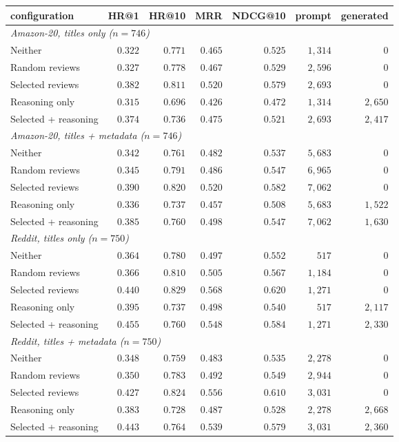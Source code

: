 \begin{tabular}{lrrrrrr}
\toprule
configuration & HR@1 & HR@10 & MRR & NDCG@10 & prompt & generated \\
\midrule\multicolumn{7}{l}{\emph{Amazon-20, titles only ($n=746$)}} \\
Neither & $0.322$ & $0.771$ & $0.465$ & $0.525$ & $1{,}314$ & $0$ \\
Random reviews & $0.327$ & $0.778$ & $0.467$ & $0.529$ & $2{,}596$ & $0$ \\
Selected reviews & $0.382$ & $0.811$ & $0.520$ & $0.579$ & $2{,}693$ & $0$ \\
Reasoning only & $0.315$ & $0.696$ & $0.426$ & $0.472$ & $1{,}314$ & $2{,}650$ \\
Selected + reasoning & $0.374$ & $0.736$ & $0.475$ & $0.521$ & $2{,}693$ & $2{,}417$ \\
\midrule\multicolumn{7}{l}{\emph{Amazon-20, titles + metadata ($n=746$)}} \\
Neither & $0.342$ & $0.761$ & $0.482$ & $0.537$ & $5{,}683$ & $0$ \\
Random reviews & $0.345$ & $0.791$ & $0.486$ & $0.547$ & $6{,}965$ & $0$ \\
Selected reviews & $0.390$ & $0.820$ & $0.520$ & $0.582$ & $7{,}062$ & $0$ \\
Reasoning only & $0.336$ & $0.737$ & $0.457$ & $0.508$ & $5{,}683$ & $1{,}522$ \\
Selected + reasoning & $0.385$ & $0.760$ & $0.498$ & $0.547$ & $7{,}062$ & $1{,}630$ \\
\midrule\multicolumn{7}{l}{\emph{Reddit, titles only ($n=750$)}} \\
Neither & $0.364$ & $0.780$ & $0.497$ & $0.552$ & $517$ & $0$ \\
Random reviews & $0.366$ & $0.810$ & $0.505$ & $0.567$ & $1{,}184$ & $0$ \\
Selected reviews & $0.440$ & $0.829$ & $0.568$ & $0.620$ & $1{,}271$ & $0$ \\
Reasoning only & $0.395$ & $0.737$ & $0.498$ & $0.540$ & $517$ & $2{,}117$ \\
Selected + reasoning & $0.455$ & $0.760$ & $0.548$ & $0.584$ & $1{,}271$ & $2{,}330$ \\
\midrule\multicolumn{7}{l}{\emph{Reddit, titles + metadata ($n=750$)}} \\
Neither & $0.348$ & $0.759$ & $0.483$ & $0.535$ & $2{,}278$ & $0$ \\
Random reviews & $0.350$ & $0.783$ & $0.492$ & $0.549$ & $2{,}944$ & $0$ \\
Selected reviews & $0.427$ & $0.824$ & $0.556$ & $0.610$ & $3{,}031$ & $0$ \\
Reasoning only & $0.383$ & $0.728$ & $0.487$ & $0.528$ & $2{,}278$ & $2{,}668$ \\
Selected + reasoning & $0.443$ & $0.764$ & $0.539$ & $0.579$ & $3{,}031$ & $2{,}360$ \\
\bottomrule
\end{tabular}
